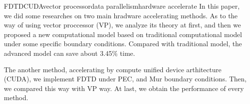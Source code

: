 \addtocounter{page}{-1}
\begin{Eabstract}{FDTD}{CUDA}{vector processor}{data parallelism}{hardware accelerate}
	In this paper, we did some researches on two main hradware accelerating methods. As to the way of using vector proccessor (VP), we analyze its theory at first, and then we proposed a new computational model based on traditional computational model under some specific boundary conditions. Compared with traditional model, the advanced model can save about 3.45\% time.

	The another method, accelerating by compute unified device arthitecture (CUDA), we implement FDTD under PEC, and Mur boundary conditions. Then, we compared this way with VP way. At last, we obtain the performance of every method.
\end{Eabstract}
